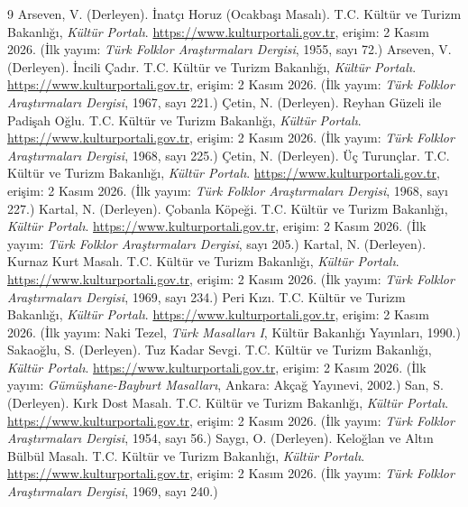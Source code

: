\documentclass[12pt,a4paper]{article}
\begin{document}
\begin{thebibliography}{9}
 Arseven, V. (Derleyen). İnatçı Horuz (Ocakbaşı Masalı). T.C. Kültür ve Turizm Bakanlığı, \emph{Kültür Portalı}. \url{https://www.kulturportali.gov.tr}, erişim: 2 Kasım 2026. (İlk yayım: \emph{Türk Folklor Araştırmaları Dergisi}, 1955, sayı 72.)
 Arseven, V. (Derleyen). İncili Çadır. T.C. Kültür ve Turizm Bakanlığı, \emph{Kültür Portalı}. \url{https://www.kulturportali.gov.tr}, erişim: 2 Kasım 2026. (İlk yayım: \emph{Türk Folklor Araştırmaları Dergisi}, 1967, sayı 221.)
 Çetin, N. (Derleyen). Reyhan Güzeli ile Padişah Oğlu. T.C. Kültür ve Turizm Bakanlığı, \emph{Kültür Portalı}. \url{https://www.kulturportali.gov.tr}, erişim: 2 Kasım 2026. (İlk yayım: \emph{Türk Folklor Araştırmaları Dergisi}, 1968, sayı 225.)
 Çetin, N. (Derleyen). Üç Turunçlar. T.C. Kültür ve Turizm Bakanlığı, \emph{Kültür Portalı}. \url{https://www.kulturportali.gov.tr}, erişim: 2 Kasım 2026. (İlk yayım: \emph{Türk Folklor Araştırmaları Dergisi}, 1968, sayı 227.)
 Kartal, N. (Derleyen). Çobanla Köpeği. T.C. Kültür ve Turizm Bakanlığı, \emph{Kültür Portalı}. \url{https://www.kulturportali.gov.tr}, erişim: 2 Kasım 2026. (İlk yayım: \emph{Türk Folklor Araştırmaları Dergisi}, sayı 205.)
 Kartal, N. (Derleyen). Kurnaz Kurt Masalı. T.C. Kültür ve Turizm Bakanlığı, \emph{Kültür Portalı}. \url{https://www.kulturportali.gov.tr}, erişim: 2 Kasım 2026. (İlk yayım: \emph{Türk Folklor Araştırmaları Dergisi}, 1969, sayı 234.)
 Peri Kızı. T.C. Kültür ve Turizm Bakanlığı, \emph{Kültür Portalı}. \url{https://www.kulturportali.gov.tr}, erişim: 2 Kasım 2026. (İlk yayım: Naki Tezel, \emph{Türk Masalları I}, Kültür Bakanlığı Yayınları, 1990.)
 Sakaoğlu, S. (Derleyen). Tuz Kadar Sevgi. T.C. Kültür ve Turizm Bakanlığı, \emph{Kültür Portalı}. \url{https://www.kulturportali.gov.tr}, erişim: 2 Kasım 2026. (İlk yayım: \emph{Gümüşhane-Bayburt Masalları}, Ankara: Akçağ Yayınevi, 2002.)
 San, S. (Derleyen). Kırk Dost Masalı. T.C. Kültür ve Turizm Bakanlığı, \emph{Kültür Portalı}. \url{https://www.kulturportali.gov.tr}, erişim: 2 Kasım 2026. (İlk yayım: \emph{Türk Folklor Araştırmaları Dergisi}, 1954, sayı 56.)
 Saygı, O. (Derleyen). Keloğlan ve Altın Bülbül Masalı. T.C. Kültür ve Turizm Bakanlığı, \emph{Kültür Portalı}. \url{https://www.kulturportali.gov.tr}, erişim: 2 Kasım 2026. (İlk yayım: \emph{Türk Folklor Araştırmaları Dergisi}, 1969, sayı 240.)
\end{thebibliography}
\end{document}
